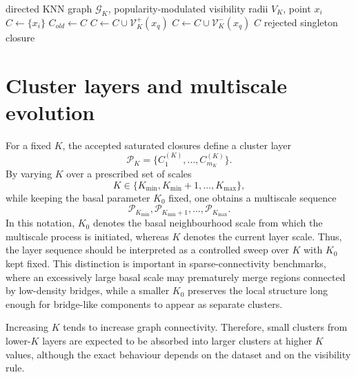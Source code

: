 \documentclass[pdflatex,sn-mathphys-num]{sn-jnl}
\newcommand{\calG}{\mathcal{G}}
\newcommand{\calP}{\mathcal{P}}
\newcommand{\calV}{\mathcal{V}}
\begin{document}
\begin{algorithm}[t]
\caption{Visibility-filtered round-trip closure for one point}
\label{alg:visibility_closure}
\begin{algorithmic}[1]
\Require directed KNN graph $\calG_K$, popularity-modulated visibility radii $V_K$, point $x_i$
\State $C \gets \{x_i\}$
\Repeat
    \State $C_{old}\gets C$
        \State $C\gets C\cup\calV_K^+(x_q)$
        \State $C\gets C\cup\calV_K^-(x_q)$
    \EndFor
{}
    \State \Return $C$
\Else
    \State \Return rejected singleton closure
\EndIf
\end{algorithmic}
\end{algorithm}

\section{Cluster layers and multiscale evolution}\label{sec:layers}

For a fixed $K$, the accepted saturated closures define a cluster layer
\begin{equation}
\calP_K=\{C_1^{(K)},\ldots,C_{m_K}^{(K)}\}.
\end{equation}
By varying $K$ over a prescribed set of scales
\begin{equation}
K\in\{K_{\min},K_{\min}+1,\ldots,K_{\max}\},
\end{equation}
while keeping the basal parameter $K_0$ fixed, one obtains a multiscale sequence
\begin{equation}
\calP_{K_{\min}},\calP_{K_{\min}+1},\ldots,\calP_{K_{\max}}.
\end{equation}
In this notation, $K_0$ denotes the basal neighbourhood scale from which the multiscale process is initiated, whereas $K$ denotes the current layer scale. Thus, the layer sequence should be interpreted as a controlled sweep over $K$ with $K_0$ kept fixed. This distinction is important in sparse-connectivity benchmarks, where an excessively large basal scale may prematurely merge regions connected by low-density bridges, while a smaller $K_0$ preserves the local structure long enough for bridge-like components to appear as separate clusters.

Increasing $K$ tends to increase graph connectivity. Therefore, small clusters from lower-$K$ layers are expected to be absorbed into larger clusters at higher $K$ values, although the exact behaviour depends on the dataset and on the visibility rule.
\end{document}
